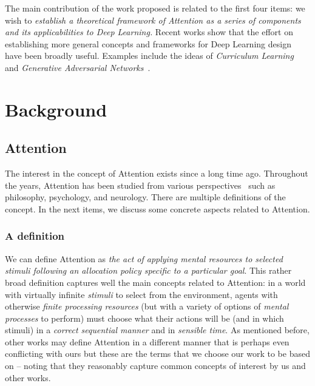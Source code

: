 \documentclass[12pt]{article}
\begin{document}
The main contribution of the work proposed is related to the first four items:
we wish to
\emph{establish a theoretical framework of Attention as a series of components
    and its applicabilities to Deep Learning.}
Recent works show that the effort on establishing more general concepts and frameworks for
Deep Learning design have been broadly useful.
Examples include the ideas of \emph{Curriculum Learning}~\cite{ref:curriculum}
and \emph{Generative Adversarial Networks}~\cite{ref:gans}.

\newpage
\section{Background}
\subsection{Attention}
\label{attention}
The interest in the concept of Attention exists since a long time ago.
Throughout the years, Attention has been studied
from various perspectives~\cite{ref:esther-thesis}
such as philosophy, psychology, and neurology.
There are multiple definitions of the concept.
In the next items, we discuss some concrete aspects related to Attention.

\subsubsection{A definition}
We can define Attention as
\emph{the act of applying mental resources to selected stimuli following an allocation policy specific to
    a particular goal}.
This rather broad definition captures well the main concepts related to Attention:
in a world with virtually infinite
\emph{stimuli} to select from the environment, agents with otherwise \emph{finite processing
resources} (but with a variety of options of \emph{mental processes} to perform) must choose what their
actions will be (and in which stimuli) in a \emph{correct sequential manner} and in \emph{sensible time}.
As mentioned before, other works may define Attention in a different manner
that is perhaps even conflicting with ours but
these are the terms that we choose our work to be based on -- noting that they
reasonably capture common concepts of interest by us and other works.~\cite{ref:helgason}
\end{document}
